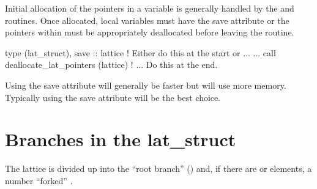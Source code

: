 {
Initial allocation of the pointers in a  variable is
generally handled by the  
and 
routines.  Once allocated, local  variables must have
the save attribute or the pointers within must be appropriately
deallocated before leaving the routine.
\begin{example}
  type (lat_struct), save :: lattice     ! Either do this at the start or ...
  ...
  call deallocate_lat_pointers (lattice) ! ... Do this at the end.
\end{example}
Using the save attribute will generally be faster but will use more
memory. Typically using the save attribute will be the best choice.

\section{Branches in the lat_struct}
\label {s:lat.struct}

The lattice is divided up into the ``root branch'' () and,
if there are  or  elements, a number ``forked''
.

}

